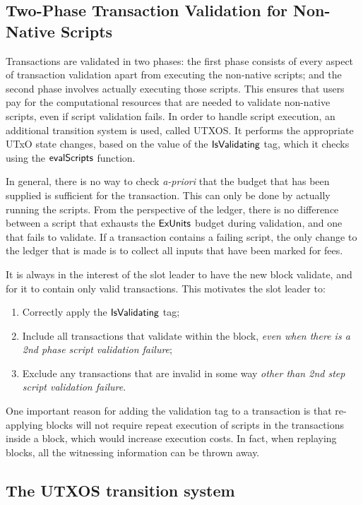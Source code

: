 \subsection{Two-Phase Transaction Validation for Non-Native Scripts}
\label{sec:two-phase}

Transactions are validated in two phases:
the first phase consists of every aspect of transaction validation apart from executing the non-native scripts; and
the second phase involves actually executing those scripts.
This ensures that users pay for the computational resources that are needed to validate non-native scripts, even
if script validation fails. %
In order to handle script execution, an additional transition system is used, called UTXOS.
It performs the appropriate UTxO state changes, based on the
value of the $\mathsf{IsValidating}$ tag, which it checks using the $\mathsf{evalScripts}$ function.

In general, there is no way to check \emph{a-priori} that the budget that has been supplied is sufficient for the transaction.
This can only be done by actually running the scripts. From the perspective of the ledger, there is no difference
between a script that exhausts the $\mathsf{ExUnits}$ budget during validation, and one that fails to validate.
If a transaction contains a failing script, the only change to the ledger that is made
is to collect all inputs that have been marked for fees.

It is always in the interest of the slot leader to have the new block validate,
and for it to contain only valid transactions. This motivates the
slot leader to:

\begin{enumerate}
  \item Correctly apply the $\mathsf{IsValidating}$ tag;
  \item Include all transactions that validate within the block,
  \textit{even when there is a 2nd phase script validation failure};
  \item Exclude any transactions that are invalid in some way \textit{other than 2nd step script validation failure}.
\end{enumerate}

One important reason for adding the validation tag
to a transaction is that re-applying blocks will not require repeat
execution of scripts in the transactions inside a block, which would increase execution costs.
In fact, when replaying
blocks, all the witnessing information can be thrown away.

\subsection{The UTXOS transition system}
\label{sec:utxo-state-trans}

